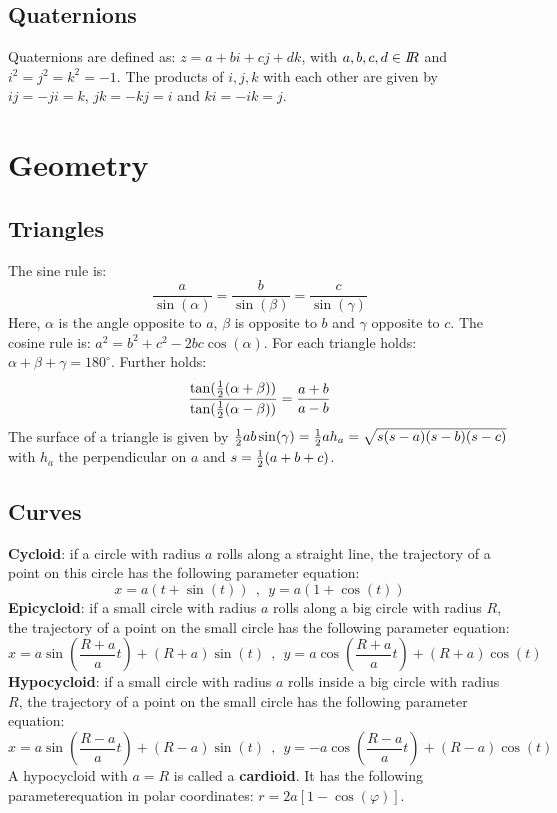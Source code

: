 \documentclass[a4paper,fancyheadings,twoside]{report}
\begin{document}
\subsection{Quaternions}
Quaternions are defined as: $z=a+bi+cj+dk$, with $a,b,c,d\in I\hspace{-1mm}R$ and
$i^2=j^2=k^2=-1$. The products of $i,j,k$ with each other are given by
$ij=-ji=k$, $jk=-kj=i$ and $ki=-ik=j$.

\section{Geometry}
\subsection{Triangles}
The sine rule is:
\[
\frac{a}{\sin(\alpha)}=\frac{b}{\sin(\beta)}=\frac{c}{\sin(\gamma)}
\]
Here, $\alpha$ is the angle opposite to $a$, $\beta$ is opposite to $b$ and
$\gamma$ opposite to $c$. The cosine rule is: $a^2=b^2+c^2-2bc\cos(\alpha)$.
For each triangle holds: $\alpha+\beta+\gamma=180^\circ$.
\npar
Further holds:
\[
\frac{\tan(\mbox{$\frac{1}{2}$}(\alpha+\beta))}{\tan(\mbox{$\frac{1}{2}$}(\alpha-\beta))}=\frac{a+b}{a-b}
\]
The surface of a triangle is given by $\mbox{$\frac{1}{2}$} ab\sin(\gamma)=\mbox{$\frac{1}{2}$} ah_a=\sqrt{s(s-a)(s-b)(s-c)}$
with $h_a$ the perpendicular on $a$ and $s=\mbox{$\frac{1}{2}$}(a+b+c)$.

\subsection{Curves}
{\bf Cycloid}: if a circle with radius $a$ rolls along a straight line, the
trajectory of a point on this circle has the following parameter equation:
\[
x=a(t+\sin(t))~~,~~y=a(1+\cos(t))
\]
{\bf Epicycloid}: if a small circle with radius $a$ rolls along a big circle
with radius $R$, the trajectory of a point on the small circle has the
following parameter equation:
\[
x=a\sin\left(\frac{R+a}{a}t\right)+(R+a)\sin(t)~~,~~
y=a\cos\left(\frac{R+a}{a}t\right)+(R+a)\cos(t)
\]
{\bf Hypocycloid}: if a small circle with radius $a$ rolls inside a big circle
with radius $R$, the trajectory of a point on the small circle has the
following parameter equation:
\[
x=a\sin\left(\frac{R-a}{a}t\right)+(R-a)\sin(t)~~,~~
y=-a\cos\left(\frac{R-a}{a}t\right)+(R-a)\cos(t)
\]
A hypocycloid with $a=R$ is called a {\bf cardioid}. It has the following
parameterequation in polar coordinates: $r=2a[1-\cos(\varphi)]$.
\end{document}

